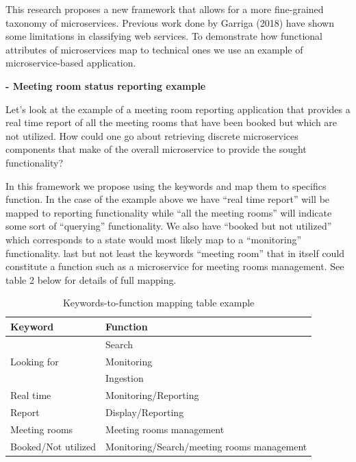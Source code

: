 \documentclass{article}
\begin{document}
This research proposes a new framework that allows for a more fine-grained taxonomy of microservices. Previous work done by Garriga (2018) have shown some limitations in classifying web services. To demonstrate how functional attributes of microservices map to technical ones we use an example of microservice-based application.

\textbf{- Meeting room status reporting example}

Let's look at the example of a meeting room reporting application that provides a real time report of all the meeting rooms that have been booked but which are not utilized. How could one go about retrieving discrete microservices components that make of the overall microservice to provide the sought functionality?

In this framework we propose using the keywords and map them to specifics function. In the case of the example above we have “real time report” will be mapped to reporting functionality while “all the meeting rooms” will indicate some sort of “querying” functionality. We also have “booked but not utilized” which corresponds to a state would most likely map to a “monitoring” functionality. last but not least the keywords “meeting room” that in itself could constitute a function such as a microservice for meeting rooms management. See table 2 below for details of full mapping.


\begin{table}[h!]
  \begin{center}
  \small
    \begin{tabular}{|l|l|} %
    \hline
    \textbf{Keyword} & \textbf{Function}\\
    \hline
      \multirow{3}{*}{Looking for} & Search\\
      & Monitoring\\ 
      & Ingestion\\
      \hline
      Real time & Monitoring/Reporting\\
      \hline
      Report & Display/Reporting\\
      \hline
      Meeting rooms & Meeting rooms management\\
      \hline
      Booked/Not utilized & Monitoring/Search/meeting rooms management\\
      \hline
    \end{tabular}
        \caption{Keywords-to-function mapping table example}
    \label{tab:Table 2}
  \end{center}
\end{table}
\end{document}
